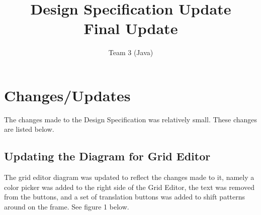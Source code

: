 \documentclass[12pt]{article}
\begin{document}
	
	\setlength{\parindent}{15pt}
	\newcommand{\forceindent}{\leavevmode{\parindent=2em\indent}}
	
	
	\title{ Design Specification Update \\ Final Update}
	\author{Team 3 (Java)}
	\date{}
	\maketitle
	
	\tableofcontents
	\setcounter{tocdepth}{3}		%
	\newpage
	
	\appendix
	
		\section{Changes/Updates}
		\forceindent The changes made to the Design Specification was relatively small. These changes are listed below.
		
			\subsection {Updating the Diagram for Grid Editor}
			\forceindent The grid editor diagram was updated to reflect the changes made to it, namely a color picker was added to the right side of the Grid Editor, the text was removed from the buttons, and a set of translation buttons was added to shift patterns around on the frame. See figure 1 below.
      
\end{document}
